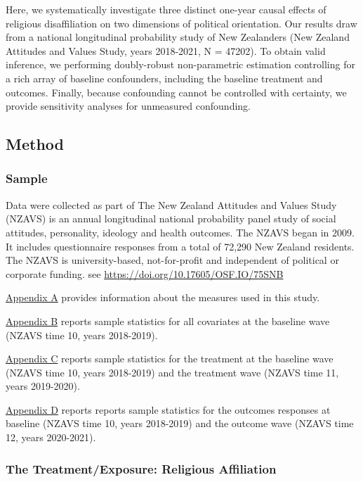 \documentclass[
  singlecolumn]{article}
\begin{document}
Here, we systematically investigate three distinct one-year causal
effects of religious disaffiliation on two dimensions of political
orientation. Our results draw from a national longitudinal probability
study of New Zealanders (New Zealand Attitudes and Values Study, years
2018-2021, N = 47202). To obtain valid inference, we performing
doubly-robust non-parametric estimation controlling for a rich array of
baseline confounders, including the baseline treatment and outcomes.
Finally, because confounding cannot be controlled with certainty, we
provide sensitivity analyses for unmeasured confounding.

\subsection{Method}\label{method}

\subsubsection{Sample}\label{sample}

Data were collected as part of The New Zealand Attitudes and Values
Study (NZAVS) is an annual longitudinal national probability panel study
of social attitudes, personality, ideology and health outcomes. The
NZAVS began in 2009. It includes questionnaire responses from a total of
72,290 New Zealand residents. The NZAVS is university-based,
not-for-profit and independent of political or corporate funding. see
\url{https://doi.org/10.17605/OSF.IO/75SNB}

\hyperref[appendix-measures]{Appendix A} provides information about the
measures used in this study.

\hyperref[appendix-demographics]{Appendix B} reports sample statistics
for all covariates at the baseline wave (NZAVS time 10, years
2018-2019).

\hyperref[appendix-exposures]{Appendix C} reports sample statistics for
the treatment at the baseline wave (NZAVS time 10, years 2018-2019) and
the treatment wave (NZAVS time 11, years 2019-2020).

\hyperref[appendix-outcomes]{Appendix D} reports reports sample
statistics for the outcomes responses at baseline (NZAVS time 10, years
2018-2019) and the outcome wave (NZAVS time 12, years 2020-2021).

\subsubsection{The Treatment/Exposure: Religious
Affiliation}\label{the-treatmentexposure-religious-affiliation}
\end{document}
